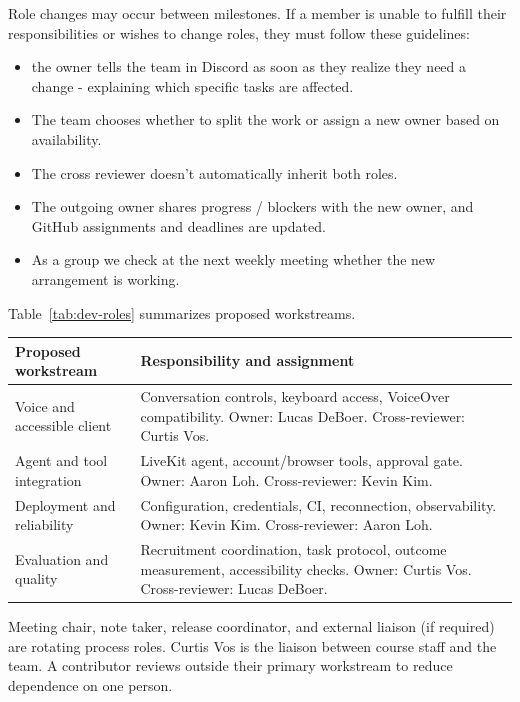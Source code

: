 \documentclass[11pt]{article}
\begin{document}
Role changes may occur between milestones. If a member is unable to fulfill their responsibilities or wishes to change roles, they must follow these guidelines:
\begin{itemize}
\item the owner tells the team in Discord as soon as they realize they need a change - explaining which specific tasks are affected.
\item The team chooses whether to split the work or assign a new owner based on availability.
\item The cross reviewer doesn't automatically inherit both roles.
\item The outgoing owner shares progress / blockers with the new owner, and GitHub assignments and deadlines are updated.
\item As a group we check at the next weekly meeting whether the new arrangement is working.
\end{itemize}

Table~\ref{tab:dev-roles} summarizes proposed workstreams.
\begin{center}
\begin{minipage}{\textwidth}
\label{tab:dev-roles}
\begin{tabularx}{\textwidth}{>{\raggedright\arraybackslash}p{}X}
\toprule Proposed workstream & Responsibility and assignment\\\midrule
Voice and accessible client & Conversation controls, keyboard access, VoiceOver compatibility. Owner: Lucas DeBoer. Cross-reviewer: Curtis Vos.\\
Agent and tool integration & LiveKit agent, account/browser tools, approval gate. Owner: Aaron Loh. Cross-reviewer: Kevin Kim.\\
Deployment and reliability & Configuration, credentials, CI, reconnection, observability. Owner: Kevin Kim. Cross-reviewer: Aaron Loh.\\
Evaluation and quality & Recruitment coordination, task protocol, outcome measurement, accessibility checks. Owner: Curtis Vos. Cross-reviewer: Lucas DeBoer.\\
\bottomrule
\end{tabularx}
\end{minipage}
\end{center}
Meeting chair, note taker, release coordinator, and external liaison (if required) are rotating process
roles. Curtis Vos is the liaison between course staff and the team. A contributor reviews outside their primary workstream to reduce dependence
on one person.
\end{document}
